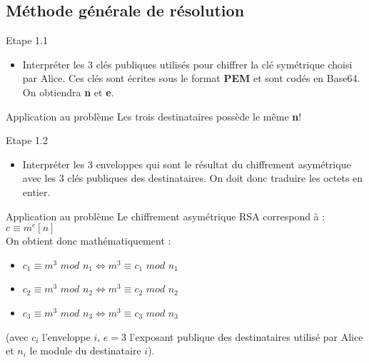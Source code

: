 \documentclass{beamer}
\begin{document}
	\subsection{Méthode générale de résolution}
    \begin{frame}
	\begin{block}{Etape 1.1}
		\begin{itemize}
		\item Interpréter les 3 clés publiques utilisés pour chiffrer la clé symétrique choisi par Alice. Ces clés sont écrites sous le format \textbf{PEM} et sont codés en Base64. On obtiendra \textbf{n} et \textbf{e}. 
		\end{itemize}
	\end{block}
	\begin{exampleblock}{Application au problème} 
		Les trois destinataires possède le même \textbf{n}!
	\end{exampleblock}
	\end{frame}
	\begin{frame}
	\begin{block}{Etape 1.2}
		\begin{itemize}
			\item Interpréter les 3 enveloppes qui sont le résultat du chiffrement asymétrique avec les 3 clés publiques des destinataires. On doit donc traduire les octets en entier.
		\end{itemize}
	\end{block}

	\begin{exampleblock}{Application au problème} 
		Le chiffrement asymétrique RSA correspond à : $c \equiv m^e [n]$ \\
		On obtient donc mathématiquement :
		\begin{itemize}
			\item $c_1 \equiv m^3$ $mod$ $n_1 \Leftrightarrow m^3 \equiv c_1$ $mod$ $n_1$
			\item $c_2 \equiv m^3$ $mod$ $n_2\Leftrightarrow m^3 \equiv c_2$ $mod$ $n_2$
			\item $c_3 \equiv m^3$ $mod$ $n_3\Leftrightarrow m^3 \equiv c_3$ $mod$ $n_3$
		\end{itemize}
		(avec $c_i$ l'enveloppe $i$, $e=3$ l'exposant publique des destinataires utilisé par Alice et $n_i$ le module du destinataire $i$).
	\end{exampleblock}
	\end{frame}
\end{document}
